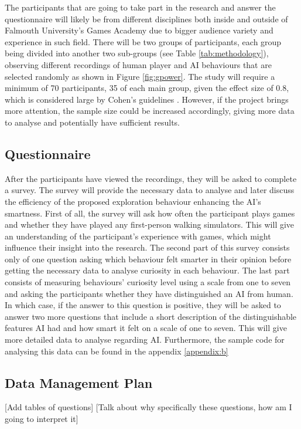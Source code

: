 \documentclass[journal]{IEEEtran}
\begin{document}
The participants that are going to take part in the research and answer the questionnaire will likely be from different disciplines both inside and outside of Falmouth University's Games Academy due to bigger audience variety and experience in such field. There will be two groups of participants, each group being divided into another two sub-groups (see Table \ref{tab:methodology}), observing different recordings of human player and AI behaviours that are selected randomly as shown in Figure \ref{fig:gpower}. The study will require a minimum of 70 participants, 35 of each main group, given the effect size of 0.8, which is considered large by Cohen's guidelines \cite{cohen1992power}. However, if the project brings more attention, the sample size could be increased accordingly, giving more data to analyse and potentially have sufficient results. %

\subsection{Questionnaire} \label{data} %
After the participants have viewed the recordings, they will be asked to complete a survey. The survey will provide the necessary data to analyse and later discuss the efficiency of the proposed exploration behaviour enhancing the AI's smartness. First of all, the survey will ask how often the participant plays games and whether they have played any first-person walking simulators. This will give an understanding of the participant's experience with games, which might influence their insight into the research. The second part of this survey consists only of one question asking which behaviour felt smarter in their opinion before getting the necessary data to analyse curiosity in each behaviour. The last part consists of measuring behaviours' curiosity level using a scale from one to seven and asking the participants whether they have distinguished an AI from human. In which case, if the answer to this question is positive, they will be asked to answer two more questions that include a short description of the distinguishable features AI had and how smart it felt on a scale of one to seven. This will give more detailed data to analyse regarding AI. Furthermore, the sample code for analysing this data can be found in the appendix \ref{appendix:b}

\subsection{Data Management Plan}
[Add tables of questions]
[Talk about why specifically these questions, how am I going to interpret it]
\end{document}
